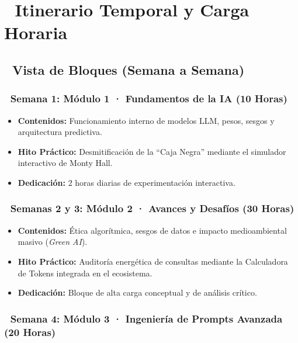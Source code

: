 \documentclass[
  spanish,
  letterpaper,
  DIV=11,
  numbers=noendperiod,
  oneside]{scrreprt}
\providecommand{\tightlist}{%
  \setlength{\itemsep}{0pt}\setlength{\parskip}{0pt}}
\begin{document}
\section{📅 Itinerario Temporal y Carga
Horaria}\label{itinerario-temporal-y-carga-horaria}

\subsection{📐 Vista de Bloques (Semana a Semana)}

\subsubsection{🔹 Semana 1: Módulo 1 · Fundamentos de la IA (10
Horas)}\label{semana-1-muxf3dulo-1-fundamentos-de-la-ia-10-horas}

\begin{itemize}
\tightlist
\item
  \textbf{Contenidos:} Funcionamiento interno de modelos LLM, pesos,
  sesgos y arquitectura predictiva.
\item
  \textbf{Hito Práctico:} Desmitificación de la ``Caja Negra'' mediante
  el simulador interactivo de Monty Hall.
\item
  \textbf{Dedicación:} 2 horas diarias de experimentación interactiva.
\end{itemize}

\subsubsection{🔹 Semanas 2 y 3: Módulo 2 · Avances y Desafíos (30
Horas)}\label{semanas-2-y-3-muxf3dulo-2-avances-y-desafuxedos-30-horas}

\begin{itemize}
\tightlist
\item
  \textbf{Contenidos:} Ética algorítmica, sesgos de datos e impacto
  medioambiental masivo (\emph{Green AI}).
\item
  \textbf{Hito Práctico:} Auditoría energética de consultas mediante la
  Calculadora de Tokens integrada en el ecosistema.
\item
  \textbf{Dedicación:} Bloque de alta carga conceptual y de análisis
  crítico.
\end{itemize}

\subsubsection{🔹 Semana 4: Módulo 3 · Ingeniería de Prompts Avanzada
(20
Horas)}\label{semana-4-muxf3dulo-3-ingenieruxeda-de-prompts-avanzada-20-horas}
\end{document}
